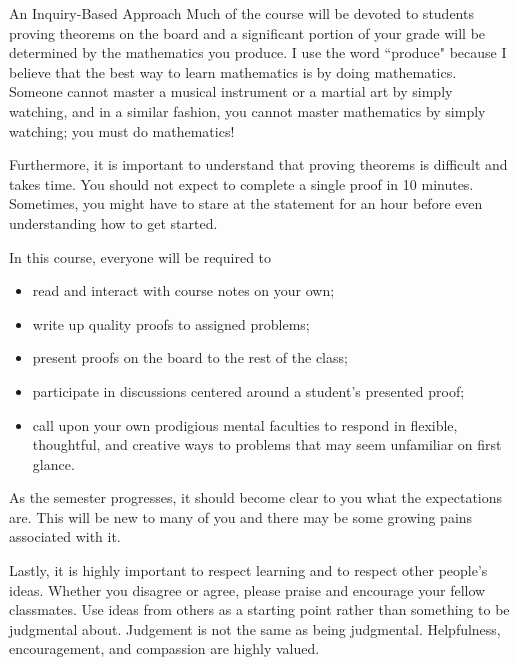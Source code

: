 \begin{section}{An Inquiry-Based Approach}
Much of the course will be devoted to students proving theorems on the board and a significant portion of your grade will be determined by the  mathematics you produce. I use the word ``produce" because I believe that the best way to learn mathematics is by doing mathematics. Someone cannot master a musical instrument or a martial art by simply watching, and in a similar fashion, you cannot master mathematics by simply watching; you must do mathematics!

Furthermore, it is important to understand that proving theorems is difficult and takes time. You should not expect to complete a single proof in 10 minutes. Sometimes, you might have to stare at the statement for an hour before even understanding how to get started. 

In this course, everyone will be required to
\begin{itemize}
\item read and interact with course notes on your own;
\item write up quality proofs to assigned problems;
\item present proofs on the board to the rest of the class;
\item participate in discussions centered around a student's presented proof;
\item call upon your own prodigious mental faculties to respond in flexible, thoughtful, and creative ways to problems that may seem unfamiliar on first glance.
\end{itemize}
\noindent As the semester progresses, it should become clear to you what the expectations are. This will be new to many of you and there may be some growing pains associated with it.

Lastly, it is highly important to respect learning and to respect other people's ideas.  Whether you disagree or agree, please praise and encourage your fellow classmates.  Use ideas from others as a starting point rather than something to be judgmental about.  Judgement is not the same as being judgmental.  Helpfulness, encouragement, and compassion are highly valued.
\end{section}

